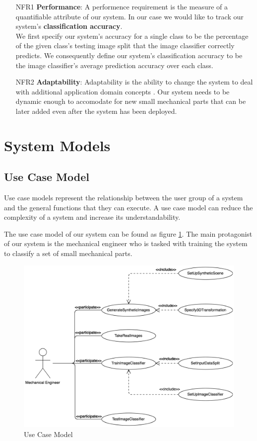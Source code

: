 \documentclass[a4paper,12pt,twoside]{report}
\begin{document}
\begin{itemize}
  \item [NFR1] \textbf{Performance}: A performence requirement is the measure of a quantifiable attribute of our system. In our case we would like to track our system's \textbf{classification accuracy}.\\
  We first specify our system's accuracy for a single class to be the percentage of the given class's testing image split that the image classifier correctly predicts. We consequently define our system's classification accuracy to be the image classifier's average prediction accuracy over each class.

  \item [NFR2] \textbf{Adaptability}: Adaptability is the ability to change the system to deal with additional application domain concepts \cite{bruegge2004object}. Our system needs to be dynamic enough to accomodate for new small mechanical parts that can be later added even after the system has been deployed.
\end{itemize}

\section{System Models}

\subsection{Use Case Model}

Use case models represent the relationship between the user group of a system and the general functions that they can execute. A use case model can reduce the complexity of a system and increase its understandability.

The use case model of our system can be found as figure \ref{fig:UCM}. The main protagonist of our system is the mechanical engineer who is tasked with training the system to classify a set of small mechanical parts.

\begin{figure}[t]
\centering
  \includegraphics[width=\textwidth]{UCM}
\caption{Use Case Model}
\label{fig:UCM}
\end{figure}
\end{document}
